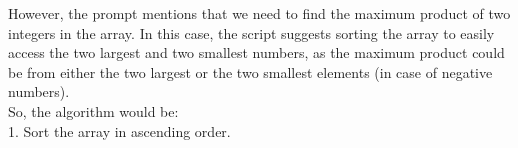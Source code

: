 \documentclass[preview]{standalone}
\begin{document}
However, the prompt mentions that we need to find the maximum product of two integers in the array. In this case, the script suggests sorting the array to easily access the two largest and two smallest numbers, as the maximum product could be from either the two largest or the two smallest elements (in case of negative numbers).\\So, the algorithm would be:\\1. Sort the array in ascending order.\\
\end{document}
